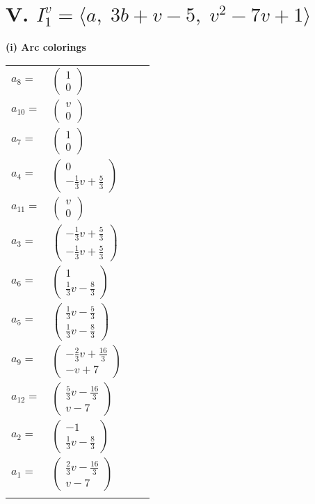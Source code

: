 \documentclass[1p]{elsarticle_modified}
\theoremstyle{definition}
\begin{document}
\centering \section*{V. $I^v_{1}= \langle a,\;3 b+v-5,\;v^2-7 v+1 \rangle$}
\flushleft \textbf{(i) Arc colorings}\\
\begin{tabular}{m{7pt} m{180pt} m{7pt} m{180pt} }
\flushright $a_{8}=$&$\begin{pmatrix}1\\0\end{pmatrix}$ \\
\flushright $a_{10}=$&$\begin{pmatrix}v\\0\end{pmatrix}$ \\
\flushright $a_{7}=$&$\begin{pmatrix}1\\0\end{pmatrix}$ \\
\flushright $a_{4}=$&$\begin{pmatrix}0\\-\frac{1}{3} v+\frac{5}{3}\end{pmatrix}$ \\
\flushright $a_{11}=$&$\begin{pmatrix}v\\0\end{pmatrix}$ \\
\flushright $a_{3}=$&$\begin{pmatrix}-\frac{1}{3} v+\frac{5}{3}\\-\frac{1}{3} v+\frac{5}{3}\end{pmatrix}$ \\
\flushright $a_{6}=$&$\begin{pmatrix}1\\\frac{1}{3} v-\frac{8}{3}\end{pmatrix}$ \\
\flushright $a_{5}=$&$\begin{pmatrix}\frac{1}{3} v-\frac{5}{3}\\\frac{1}{3} v-\frac{8}{3}\end{pmatrix}$ \\
\flushright $a_{9}=$&$\begin{pmatrix}-\frac{2}{3} v+\frac{16}{3}\\- v+7\end{pmatrix}$ \\
\flushright $a_{12}=$&$\begin{pmatrix}\frac{5}{3} v-\frac{16}{3}\\v-7\end{pmatrix}$ \\
\flushright $a_{2}=$&$\begin{pmatrix}-1\\\frac{1}{3} v-\frac{8}{3}\end{pmatrix}$ \\
\flushright $a_{1}=$&$\begin{pmatrix}\frac{2}{3} v-\frac{16}{3}\\v-7\end{pmatrix}$\\&\end{tabular}
\end{document}

